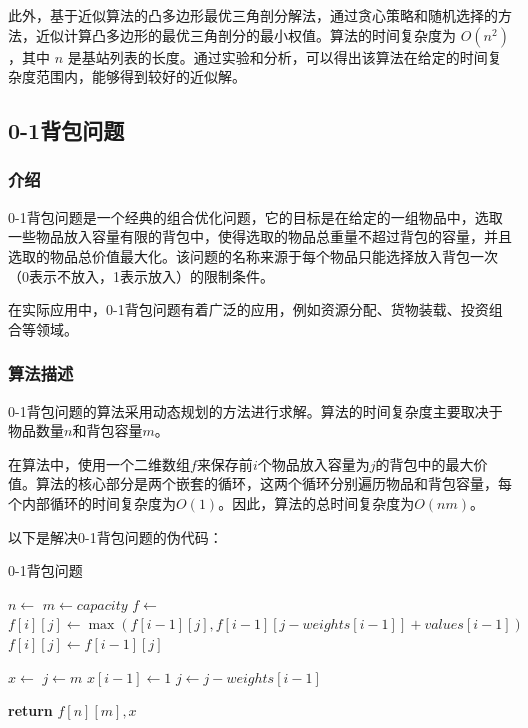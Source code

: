 \documentclass[lang=cn,11pt,a4paper]{elegantpaper}
\begin{document}
此外，基于近似算法的凸多边形最优三角剖分解法，通过贪心策略和随机选择的方法，近似计算凸多边形的最优三角剖分的最小权值。算法的时间复杂度为 $O(n^2)$，其中 $n$ 是基站列表的长度。通过实验和分析，可以得出该算法在给定的时间复杂度范围内，能够得到较好的近似解。

\subsection{0-1背包问题}

\subsubsection{介绍}
0-1背包问题是一个经典的组合优化问题，它的目标是在给定的一组物品中，选取一些物品放入容量有限的背包中，使得选取的物品总重量不超过背包的容量，并且选取的物品总价值最大化。该问题的名称来源于每个物品只能选择放入背包一次（0表示不放入，1表示放入）的限制条件。

在实际应用中，0-1背包问题有着广泛的应用，例如资源分配、货物装载、投资组合等领域。
\subsubsection{算法描述}
0-1背包问题的算法采用动态规划的方法进行求解。算法的时间复杂度主要取决于物品数量$n$和背包容量$m$。

在算法中，使用一个二维数组$f$来保存前$i$个物品放入容量为$j$的背包中的最大价值。算法的核心部分是两个嵌套的循环，这两个循环分别遍历物品和背包容量，每个内部循环的时间复杂度为$O(1)$。因此，算法的总时间复杂度为$O(nm)$。

以下是解决0-1背包问题的伪代码：

\begin{algorithm}[H]
\caption{0-1背包问题}\label{knapsack}
\begin{algorithmic}[1]
\State $n \gets$  
\State $m \gets capacity$ 
\State $f \gets$  
            \State $f[i][j] \gets \max(f[i-1][j], f[i-1][j-weights[i-1]] + values[i-1])$
        \Else
            \State $f[i][j] \gets f[i-1][j]$
        \EndIf
    \EndFor
\EndFor

\State $x \gets$  
\State $j \gets m$
        \State $x[i-1] \gets 1$
        \State $j \gets j - weights[i-1]$
    \EndIf
\EndFor

\State \textbf{return} $f[n][m], x$ 
\EndProcedure
\end{algorithmic}
\end{algorithm}
\end{document}
